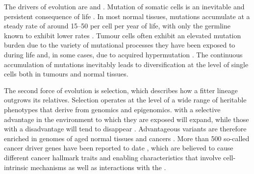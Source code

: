The drivers of evolution are  and  \parencite{Cairns1975-oz,Nowell1976-sm}. Mutation of somatic cells is an inevitable and persistent consequence of life \parencite{Martincorena2015-br, Moore2021-yr, Li2021-th}. In most normal tissues, mutations accumulate at a steady rate of around 15–50 per cell per year of life, with only the germline known to exhibit lower rates \parencite{Moore2021-yr}. Tumour cells often exhibit an elevated mutation burden due to the variety of mutational processes they have been exposed to during life and, in some cases, due to acquired hypermutation \parencite{Alexandrov2020-uo}. The continuous accumulation of mutations inevitably leads to diversification at the level of single cells both in tumours and normal tissues.

The second force of evolution is selection, which describes how a fitter lineage outgrows its relatives. Selection operates at the level of a wide range of heritable phenotypes that derive from genomics and epigenomics.  with a selective advantage in the environment to which they are exposed will expand, while those with a disadvantage will tend to disappear . Advantageous variants are therefore enriched in genomes of aged normal tissues and cancers \parencite{Greenman2006-cx,Martincorena2017-uw}. More than 500 so-called cancer driver genes have been reported to date \parencite{Lawrence2013-mi,Gonzalez-Perez2013-vo,Sondka2018-xf}, which are believed to cause different cancer hallmark traits and enabling characteristics that involve cell-intrinsic mechanisms as well as interactions with the  \parencite{Hanahan2000-ze, Hanahan2022-eb}.

